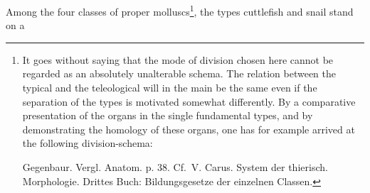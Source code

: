 \documentclass[12pt,a4paper]{book}
\begin{document}
Among the four classes of proper molluscs\footnote{It goes without saying that the mode
of division chosen here cannot be regarded as an absolutely unalterable schema. The
relation between the typical and the teleological will in the main be the same even if
the separation of the types is motivated somewhat differently. By a comparative
presentation of the organs in the single fundamental types, and by demonstrating the
homology of these organs, one has for example arrived at the following division-schema:
\par\nopagebreak
\begin{center}
\end{center}
\par\nopagebreak
Gegenbaur. Vergl. Anatom. p. 38. Cf.\ V. Carus. System der thierisch. Morphologie.
Drittes Buch: Bildungsgesetze der einzelnen Classen.}, the types cuttlefish and snail
stand on a
\end{document}

